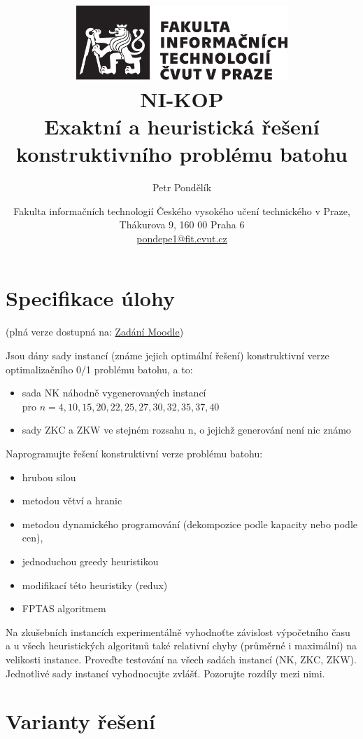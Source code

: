 \documentclass[12pt]{article}
\title{\includegraphics[width=8cm]{cvut-logo-bw.pdf}\\\vspace{2cm}NI-KOP \\ Exaktní a heuristická řešení konstruktivního problému batohu}
\author{\small Petr Pondělík} %
\date{\small Fakulta informačních technologií Českého vysokého učení technického v Praze, \\ Thákurova 9, 160 00 Praha 6 \\ \url{pondepe1@fit.cvut.cz}} %
\begin{document}
\maketitle              

\newpage

\section{Specifikace úlohy}

(plná verze dostupná na: \href{https://moodle-vyuka.cvut.cz/mod/assign/view.php?id=89697}{Zadání Moodle})

Jsou dány sady instancí (známe jejich optimální řešení) konstruktivní verze optimalizačního 0/1 problému batohu, a to:

\begin{itemize}
    \item sada NK náhodně vygenerovaných instancí \\ pro \(n=4, 10, 15, 20, 22, 25, 27, 30, 32, 35, 37, 40\)
    \item sady ZKC a ZKW ve stejném rozsahu n, o jejichž generování není nic známo
\end{itemize}

Naprogramujte řešení konstruktivní verze problému batohu:

\begin{itemize}
\item hrubou silou
\item metodou větví a hranic
\item metodou dynamického programování (dekompozice podle kapacity nebo podle cen),
\item jednoduchou greedy heuristikou
\item modifikací této heuristiky (redux)
\item FPTAS algoritmem
\end{itemize}

Na zkušebních instancích experimentálně vyhodnoťte závislost výpočetního času a u všech heuristických algoritmů také relativní chyby (průměrné i maximální)  na velikosti instance. Proveďte testování na všech sadách instancí (NK, ZKC, ZKW). Jednotlivé sady instancí vyhodnocujte zvlášť. Pozorujte rozdíly mezi nimi.

\newpage

\section{Varianty řešení}
\end{document}
